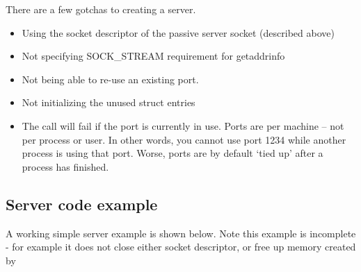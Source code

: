 There are a few gotchas to creating a server.

\begin{itemize}
\item
  Using the socket descriptor of the passive server socket (described above)
\item
  Not specifying SOCK\_STREAM requirement for getaddrinfo
\item
  Not being able to re-use an existing port.
\item
  Not initializing the unused struct entries
\item
  The  call will fail if the port is currently in use. Ports are per machine -- not per process or user.
  In other words, you cannot use port 1234 while another process is using that port.
  Worse, ports are by default `tied up' after a process has finished.
\end{itemize}

\subsection{Server code example}

A working simple server example is shown below.
Note this example is incomplete - for example it does not close either socket descriptor, or free up memory created by 

